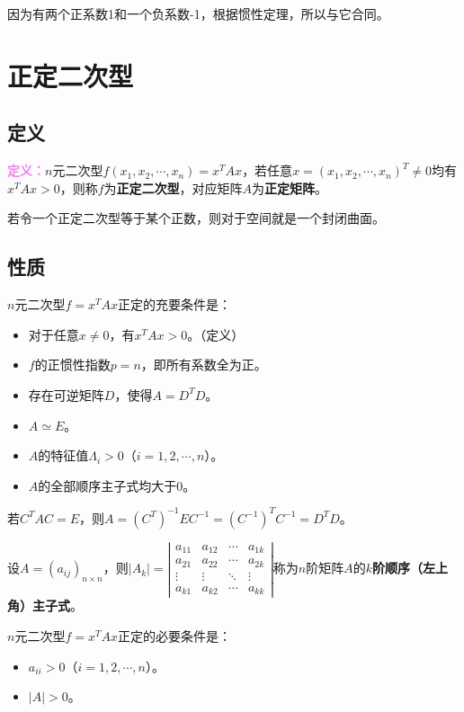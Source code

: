 \documentclass[UTF8, 12pt]{ctexart}
\begin{document}
因为有两个正系数1和一个负系数-1，根据惯性定理，所以与它合同。

\section{正定二次型}

\subsection{定义}

\textcolor{violet}{\textbf{定义：}}$n$元二次型$f(x_1,x_2,\cdots,x_n)=x^TAx$，若任意$x=(x_1,x_2,\cdots,x_n)^T\neq0$均有$x^TAx>0$，则称$f$为\textbf{正定二次型}，对应矩阵$A$为\textbf{正定矩阵}。

若令一个正定二次型等于某个正数，则对于空间就是一个封闭曲面。

\subsection{性质}

$n$元二次型$f=x^TAx$正定的充要条件是：

\begin{itemize}
    \item 对于任意$x\neq0$，有$x^TAx>0$。（定义）
    \item $f$的正惯性指数$p=n$，即所有系数全为正。
    \item 存在可逆矩阵$D$，使得$A=D^TD$。
    \item $A\simeq E$。
    \item $A$的特征值$\Lambda_i>0$（$i=1,2,\cdots,n$）。
    \item $A$的全部顺序主子式均大于0。
\end{itemize}

若$C^TAC=E$，则$A=(C^T)^{-1}EC^{-1}=(C^{-1})^TC^{-1}=D^TD$。

设$A=(a_{ij})_{n\times n}$，则$\vert A_k\vert=\left|\begin{array}{cccc}
    a_{11} & a_{12} & \cdots & a_{1k} \\
    a_{21} & a_{22} & \cdots & a_{2k} \\
    \vdots & \vdots & \ddots & \vdots \\
    a_{k1} & a_{k2} & \cdots & a_{kk}
\end{array}\right|$称为$n$阶矩阵$A$的\textbf{$k$阶顺序（左上角）主子式}。

$n$元二次型$f=x^TAx$正定的必要条件是：

\begin{itemize}
    \item $a_{ii}>0$（$i=1,2,\cdots,n$）。
    \item $\vert A\vert>0$。
\end{itemize}
\end{document}
